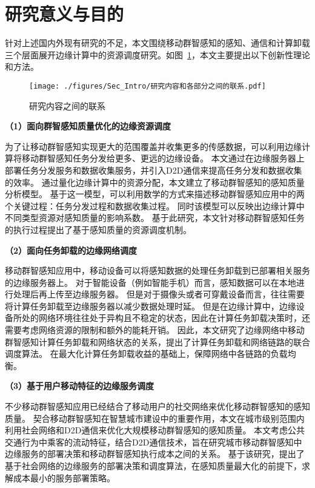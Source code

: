 
\section{研究意义与目的}

针对上述国内外现有研究的不足，本文围绕移动群智感知的感知、通信和计算卸载三个层面展开边缘计算中的资源调度研究。如图~\ref{Figure_Re_Part}，本文主要提出以下创新性理论和方法。

\begin{figure}[!h]
  \centering
  \texttt{[image: ./figures/Sec\_Intro/研究内容和各部分之间的联系.pdf]}
  \caption{研究内容之间的联系}
  \vspace{-1em}
  \label{Figure_Re_Part}
\end{figure}

\textbf{（1）面向群智感知质量优化的边缘资源调度}

为了让移动群智感知实现更大的范围覆盖并收集更多的传感数据，可以利用边缘计算将移动群智感知任务分发给更多、更远的边缘设备。
本文通过在边缘服务器上部署任务分发服务和数据收集服务，并引入D2D通信来提高任务分发和数据收集的效率。
通过量化边缘计算中的资源分配，本文建立了移动群智感知的感知质量分析模型。
基于这一模型，可以利用数学的方式来描述移动群智感知应用中的两个关键过程：任务分发过程和数据收集过程。
同时该模型可以反映出边缘计算中不同类型资源对感知质量的影响系数。
基于此研究，本文针对移动群智感知任务的执行过程提出了基于感知质量的资源调度机制。

\textbf{（2）面向任务卸载的边缘网络调度}

移动群智感知应用中，移动设备可以将感知数据的处理任务卸载到已部署相关服务的边缘服务器上。
对于智能设备（例如智能手机）而言，感知数据可以在本地进行处理后再上传至边缘服务器。
但是对于摄像头或者可穿戴设备而言，往往需要将计算任务卸载至边缘服务器以减少数据处理时延。
但是在边缘计算中，边缘设备所处的网络环境往往处于异构且不稳定的状态，因此在计算任务卸载决策时，还需要考虑网络资源的限制和额外的能耗开销。
因此，本文研究了边缘网络中移动群智感知计算任务卸载和网络状态的关系，提出了计算任务卸载和网络链路的联合调度算法。
在最大化计算任务卸载收益的基础上，保障网络中各链路的负载均衡。

\textbf{（3）基于用户移动特征的边缘服务调度}

不少移动群智感知应用已经结合了移动用户的社交网络来优化移动群智感知的感知质量。
契合移动群智感知在智慧城市建设中的重要作用，本文在城市级别范围内利用社会网络和D2D通信来优化大规模移动群智感知的感知质量。
本文考虑公共交通行为中乘客的流动特征，结合D2D通信技术，旨在研究城市移动群智感知中边缘服务的部署决策和移动群智感知执行成本之间的关系。
基于该研究，提出了基于社会网络的边缘服务的部署决策和调度算法，在感知质量最大化的前提下，求解成本最小的服务部署策略。

